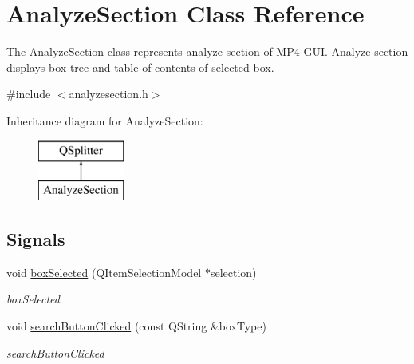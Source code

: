 \hypertarget{class_analyze_section}{\section{Analyze\-Section Class Reference}
\label{class_analyze_section}
}


The \hyperlink{class_analyze_section}{Analyze\-Section} class represents analyze section of M\-P4 G\-U\-I. Analyze section displays box tree and table of contents of selected box.  




{\ttfamily \#include $<$analyzesection.\-h$>$}

Inheritance diagram for Analyze\-Section\-:\begin{figure}[H]
\begin{center}
\leavevmode
\includegraphics[height=2.000000cm]{class_analyze_section}
\end{center}
\end{figure}
\subsection*{Signals}
\begin{DoxyCompactItemize}
\item 
void \hyperlink{class_analyze_section_a8869db713962402ec948f7007ebe28e2}{box\-Selected} (Q\-Item\-Selection\-Model $\ast$selection)
\begin{DoxyCompactList}\small\item\em box\-Selected \end{DoxyCompactList}\item 
void \hyperlink{class_analyze_section_a0e96a86027deb05142b3c6fa1abf47b2}{search\-Button\-Clicked} (const Q\-String \&box\-Type)
\begin{DoxyCompactList}\small\item\em search\-Button\-Clicked \end{DoxyCompactList}\end{DoxyCompactItemize}
